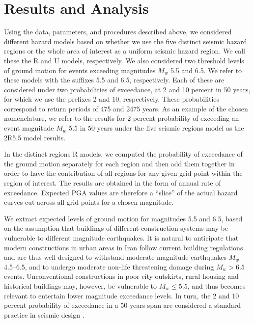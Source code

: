 \section{Results and Analysis}

Using the data, parameters, and procedures described above, we considered different hazard models based on whether we use the five distinct seismic hazard regions or the whole area of interest as a uniform seismic hazard region. We call these the R and U models, respectively. We also considered two threshold levels of ground motion for events exceeding magnitudes $M_w$ 5.5 and 6.5. We refer to these models with the suffixes 5.5 and 6.5, respectively. Each of these are considered under two probabilities of exceedance, at 2 and 10 percent in 50 years, for which we use the prefixes 2 and 10, respectively. These probabilities correspond to return periods of 475 and 2475 years. As an example of the chosen nomenclature, we refer to the results for 2 percent probability of exceeding an event magnitude $M_w$ 5.5 in 50 years under the five seismic regions model as the 2R5.5 model results.

In the distinct regions R models, we computed the probability of exceedance of the ground motion separately for each region and then add them together in order to have the contribution of all regions for any given grid point within the region of interest. The results are obtained in the form of annual rate of exceedance. Expected PGA values are therefore a ``slice'' of the actual hazard curves cut across all grid points for a chosen magnitude.

We extract expected levels of ground motion for magnitudes 5.5 and 6.5, based on the assumption that buildings of different construction systems may be vulnerable to different magnitude earthquakes. It is natural to anticipate that modern constructions in urban areas in Iran follow current building regulations and are thus well-designed to withstand moderate magnitude earthquakes $M_w$ 4.5--6.5, and to undergo moderate non-life threatening damage during $M_w > 6.5$ events. Unconventional constructions in poor city outskirts, rural housing and historical buildings may, however, be vulnerable to $M_w \leq 5.5$, and thus becomes relevant to entertain lower magnitude exceedance levels. In turn, the 2 and 10 percent probability of exceedance in a 50-years span are considered a standard practice in seismic design \citep[e.g.,][]{BHRC2014}.

